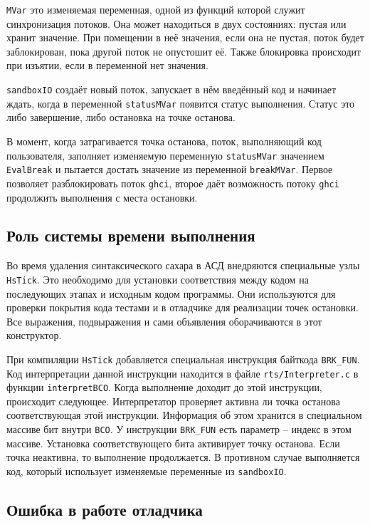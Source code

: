 \documentclass[fontsize=14pt, paper=a4, pagesize, DIV=calc]{scrartcl}
\def\code#1{\texttt{#1}}
\begin{document}
\code{MVar} это изменяемая переменная, одной из функций которой служит
синхронизация потоков. Она может находиться в двух состояниях: пустая или
хранит значение. При помещении в неё значения, если она не пустая, поток будет
заблокирован, пока   другой поток не опустошит её. Также блокировка
происходит при изъятии, если в переменной нет значения.

\code{sandboxIO} создаёт новый поток, запускает в нём введённый код и начинает
ждать, когда в переменной \code{statusMVar} появится статус выполнения. Статус
это либо завершение, либо остановка на точке останова. 

В момент, когда затрагивается точка останова, поток, выполняющий код
пользователя, заполняет изменяемую переменную \code{statusMVar} значением
\code{EvalBreak} и пытается достать значение из переменной \code{breakMVar}.
Первое позволяет разблокировать поток \code{ghci}, второе даёт возможность
потоку \code{ghci} продолжить выполнения с места остановки.

\subsection{Роль системы времени выполнения}

Во время удаления синтаксического сахара в АСД внедряются специальные узлы
\code{HsTick}. Это необходимо для установки соответствия между кодом на
последующих этапах и исходным кодом программы. Они используются для проверки
покрытия кода тестами и в отладчике для реализации точек остановки. Все
выражения, подвыражения и сами объявления оборачиваются в этот конструктор.

При компиляции \code{HsTick} добавляется специальная инструкция байткода
\code{BRK\_FUN}. Код интерпретации данной инструкции находится в файле
\code{rts/Interpreter.c} в функции \code{interpretBCO}. Когда выполнение
доходит до этой инструкции, происходит следующее. Интерпретатор проверяет
активна ли точка останова соответствующая этой инструкции. Информация об этом
хранится в специальном массиве бит внутри \code{BCO}. У инструкции
\code{BRK\_FUN} есть параметр -- индекс в этом массиве. Установка
соответствующего бита активирует точку останова. Если точка неактивна, то
выполнение продолжается. В противном случае выполняется код, который использует
изменяемые переменные из \code{sandboxIO}.

\subsection{Ошибка в работе отладчика}
\end{document}
